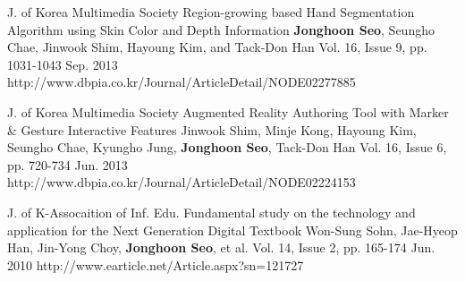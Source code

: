 \begin{cventries}

  \cvpublicationentry
    {J. of Korea Multimedia Society} %
    {Region-growing based Hand Segmentation Algorithm using Skin Color and Depth Information} %
    {\textbf{Jonghoon Seo}, Seungho Chae, Jinwook Shim, Hayoung Kim, and Tack-Don Han} %
    {Vol. 16, Issue 9, pp. 1031-1043}
    {Sep. 2013} %
    {http://www.dbpia.co.kr/Journal/ArticleDetail/NODE02277885}

  \cvpublicationentry
    {J. of Korea Multimedia Society} %
    {Augmented Reality Authoring Tool with Marker \& Gesture Interactive Features} %
    {Jinwook Shim, Minje Kong, Hayoung Kim, Seungho Chae, Kyungho Jung, \textbf{Jonghoon Seo}, Tack-Don Han} %
    {Vol. 16, Issue 6, pp. 720-734}
    {Jun. 2013} %
    {http://www.dbpia.co.kr/Journal/ArticleDetail/NODE02224153}

  \cvpublicationentry
    {J. of K-Assocaition of Inf. Edu.} %
    {Fundamental study on the technology and application for the Next Generation Digital Textbook} %
    {Won-Sung Sohn, Jae-Hyeop Han, Jin-Yong Choy, \textbf{Jonghoon Seo}, et al.} %
    {Vol. 14, Issue 2, pp. 165-174}
    {Jun. 2010} %
    {http://www.earticle.net/Article.aspx?sn=121727}


\end{cventries}

